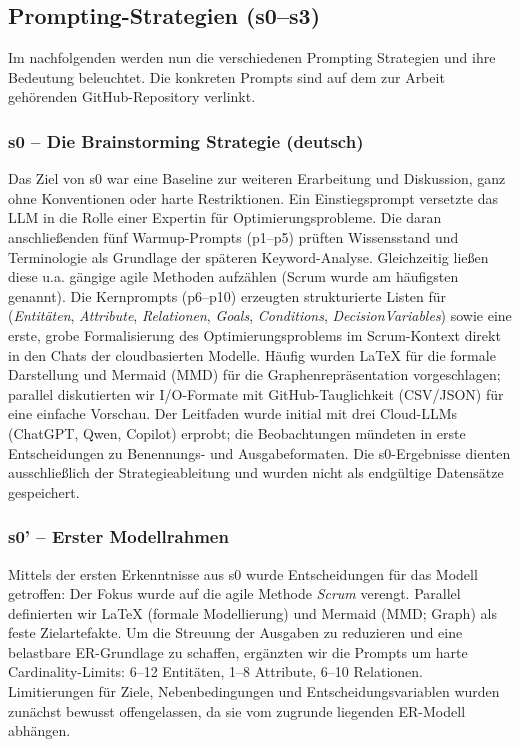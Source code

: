 \documentclass[runningheads]{llncs}
\begin{document}
\subsection{Prompting-Strategien (s0--s3)}
Im nachfolgenden werden nun die verschiedenen Prompting Strategien und ihre Bedeutung beleuchtet. Die konkreten Prompts sind auf dem zur Arbeit gehörenden GitHub-Repository verlinkt.

\subsubsection{s0 -- Die Brainstorming Strategie (deutsch)}\label{subsec:s0}
Das Ziel von s0 war eine Baseline zur weiteren Erarbeitung und Diskussion, ganz ohne Konventionen oder harte Restriktionen. Ein Einstiegsprompt versetzte das LLM in die Rolle einer Expertin für Optimierungsprobleme. Die daran anschließenden fünf Warmup-Prompts (p1–p5) prüften Wissensstand und Terminologie als Grundlage der späteren Keyword-Analyse. Gleichzeitig ließen diese u.a. gängige agile Methoden aufzählen (Scrum wurde am häufigsten genannt). Die Kernprompts (p6–p10) erzeugten  strukturierte Listen für (\emph{Entitäten}, \emph{Attribute}, \emph{Relationen}, \emph{Goals}, \emph{Conditions}, \emph{DecisionVariables}) sowie eine erste, grobe Formalisierung des Optimierungsproblems im Scrum-Kontext direkt in den Chats der cloudbasierten Modelle. Häufig wurden LaTeX für die formale Darstellung und Mermaid (MMD) für die Graphenrepräsentation vorgeschlagen; parallel diskutierten wir I/O-Formate mit GitHub-Tauglichkeit (CSV/JSON) für eine einfache Vorschau. Der Leitfaden wurde initial mit drei Cloud-LLMs (ChatGPT, Qwen, Copilot) erprobt; die Beobachtungen mündeten in erste Entscheidungen zu Benennungs- und Ausgabeformaten. Die s0-Ergebnisse dienten ausschließlich der Strategieableitung und wurden nicht als endgültige Datensätze gespeichert.

\subsubsection{s0' -- Erster Modellrahmen}\label{subsec:s0prime}
Mittels der ersten Erkenntnisse aus s0 wurde Entscheidungen für das Modell getroffen: Der Fokus wurde auf die agile Methode \emph{Scrum} verengt. Parallel definierten wir LaTeX (formale Modellierung) und Mermaid (MMD; Graph) als feste Zielartefakte. Um die Streuung der Ausgaben zu reduzieren und eine belastbare ER-Grundlage zu schaffen, ergänzten wir die Prompts um harte Cardinality-Limits: 6--12 Entitäten, 1--8 Attribute, 6--10 Relationen. Limitierungen für Ziele, Nebenbedingungen und Entscheidungsvariablen wurden zunächst bewusst offengelassen, da sie vom zugrunde liegenden ER-Modell abhängen.
\end{document}
